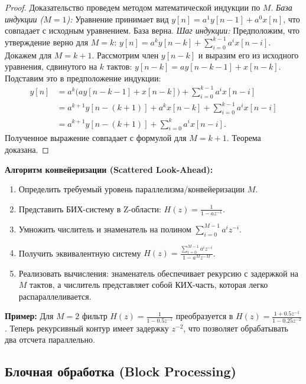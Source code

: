 \documentclass[12pt,a4paper]{article}
\begin{document}
\begin{proof}
Доказательство проведем методом математической индукции по $M$.
\newline
\textit{База индукции ($M=1$):} Уравнение принимает вид $y[n] = a^1 y[n-1] + a^0 x[n]$, что совпадает с исходным уравнением. База верна.
\newline
\textit{Шаг индукции:} Предположим, что утверждение верно для $M = k$:
$y[n] = a^k y[n-k] + \sum_{i=0}^{k-1} a^i x[n-i]$.
Докажем для $M = k+1$. Рассмотрим член $y[n-k]$ и выразим его из исходного уравнения, сдвинутого на $k$ тактов: $y[n-k] = a y[n-k-1] + x[n-k]$. Подставим это в предположение индукции:
\begin{align*}
    y[n] &= a^k \big( a y[n-k-1] + x[n-k] \big) + \sum_{i=0}^{k-1} a^i x[n-i] \\
         &= a^{k+1} y[n-(k+1)] + a^k x[n-k] + \sum_{i=0}^{k-1} a^i x[n-i] \\
         &= a^{k+1} y[n-(k+1)] + \sum_{i=0}^{k} a^i x[n-i].
\end{align*}
Полученное выражение совпадает с формулой для $M = k+1$. Теорема доказана.
\end{proof}

\textbf{Алгоритм конвейеризации (Scattered Look-Ahead):}
\begin{enumerate}[label=\textbf{Шаг \arabic*.}, leftmargin=*]
    \item Определить требуемый уровень параллелизма/конвейеризации $M$.
    \item Представить БИХ-систему в Z-области: $H(z) = \frac{1}{1 - a z^{-1}}$.
    \item Умножить числитель и знаменатель на полином $\sum_{i=0}^{M-1} a^i z^{-i}$.
    \item Получить эквивалентную систему $H(z) = \frac{\sum_{i=0}^{M-1} a^i z^{-i}}{1 - a^M z^{-M}}$.
    \item Реализовать вычисления: знаменатель обеспечивает рекурсию с задержкой на $M$ тактов, а числитель представляет собой КИХ-часть, которая легко распараллеливается.
\end{enumerate}

\textbf{Пример:} Для $M=2$ фильтр $H(z) = \frac{1}{1 - 0.5z^{-1}}$ преобразуется в $H(z) = \frac{1 + 0.5z^{-1}}{1 - 0.25z^{-2}}$. Теперь рекурсивный контур имеет задержку $z^{-2}$, что позволяет обрабатывать два отсчета параллельно.

\subsection{Блочная обработка (Block Processing)}
\end{document}
